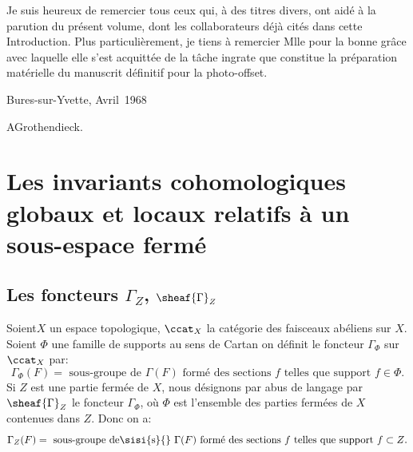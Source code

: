 Je suis heureux de remercier tous ceux qui, \`a des titres divers, ont aid\'e \`a la parution du pr\'esent volume, dont les collaborateurs d\'ej\`a cit\'es dans cette Introduction. Plus particuli\`erement, je tiens \`a remercier Mlle  pour la bonne gr\^ace avec laquelle elle s'est acquitt\'ee de la t\^ache ingrate que constitue la pr\'eparation mat\'erielle du manuscrit d\'efinitif pour la photo-offset.

\bigskip\hfill Bures-sur-Yvette, Avril~1968
\par\smallskip \hfill A\ptbl Grothendieck.

\chapter[Les invariants cohomologiques globaux et locaux]
{Les invariants cohomologiques globaux et locaux relatifs \`a un sous-espace ferm\'e} \label{I}

\section{Les foncteurs $\Gamma_Z$, $\sheaf{\Gamma}_Z$} \label{I.1}
Soient\pageoriginale $X$ un espace topologique, $\ccat_X$ la cat\'egorie des faisceaux ab\'eliens sur $X$. Soient $\Phi$ une famille de supports au sens de Cartan on d\'efinit le foncteur $\Gamma_\Phi$ sur $\ccat_X$ par:
\begin{equation} \label{eq:I.1} { \Gamma_\Phi(F) = \text{ sous-groupe de } \Gamma(F) \text{ form\'e des sections } f \text{ telles que support } f \in \Phi}.
\end{equation}
Si $Z$ est une partie ferm\'ee de $X$, nous d\'esignons par abus de langage par $\sheaf{\Gamma}_Z$ le foncteur $\Gamma_\Phi$, o\`u $\Phi$ est l'ensemble des parties ferm\'ees de $X$ contenues dans $Z$. Donc on a:
\begin{equation} \label{eq:I.2}
{\Gamma_Z(F) = \text{ sous-groupe de\sisi{s}{} } \Gamma(F) \text{ form\'e des sections } f \text{ telles que support } f \subset Z}.
\end{equation}

